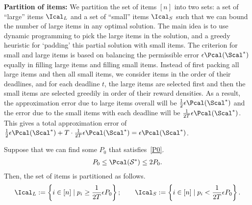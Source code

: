 \documentclass[11pt]{article}
\begin{document}
\noindent \textbf{Partition of items:} We partition the set of items $[n]$ into two sets: a set of ``large'' items $\Ical_L$ and a set of ``small'' items $\Ical_S$ such that we can bound the number of large items in any optimal solution. The main idea is to use dynamic programming to pick the large items in the solution, and a greedy heuristic for `padding' this partial solution with small items.
The criterion for small and large items is based on balancing the permissible error $\epsilon \Pcal(\Scal^*)$ equally in filling large items and filling small items. Instead of first packing all large items and then all small items, we consider items in the order of their deadlines, and for each deadline $t$, the large items are selected first and then the small items are selected greedily in order of their reward densities. As a result, the approximation error due to large items overall will be $\frac{1}{2}\epsilon \Pcal(\Scal^*)$ and the error due to the small items with each deadline will be $\frac{1}{2T}\epsilon \Pcal(\Scal^*)$. This gives a total approximation error of $\frac{1}{2}\epsilon \Pcal(\Scal^*) + T\cdot \frac{1}{2T}\epsilon \Pcal(\Scal^*) = \epsilon \Pcal(\Scal^*)$.

Suppose that we can find some $P_0$ that satisfies~\eqref{P0}. \begin{align}\label{P0}
P_0\le \Pcal(\mathcal{S}^*)\le 2P_0.
\end{align}
Then, the set of items is partitioned as follows.
\begin{equation}\label{div2}
\begin{aligned}
\Ical_L := \left\{i\in[n]\mid p_i\ge \frac{1}{2T}\epsilon P_0\right\}; \qquad 
\Ical_S := \left\{i\in[n]\mid p_i< \frac{1}{2T}\epsilon P_0\right\}.
\end{aligned}
\end{equation}
\end{document}
